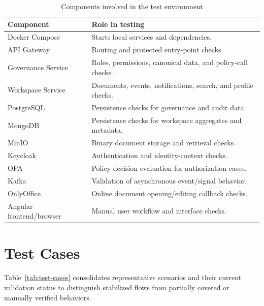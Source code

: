 \begin{table}[!htbp]
\centering
\caption{Components involved in the test environment}
\label{tab:test-environment}
{
\footnotesize
\renewcommand{\arraystretch}{1.08}
\setlength{\tabcolsep}{3.6pt}
\begin{tabularx}{\textwidth}{|L{4.0cm}|Y|}
\hline
\textbf{Component} & \textbf{Role in testing} \\
\hline
Docker Compose & Starts local services and dependencies. \\
\hline
API Gateway & Routing and protected entry-point checks. \\
\hline
Governance Service & Roles, permissions, canonical data, and policy-call checks. \\
\hline
Workspace Service & Documents, events, notifications, search, and profile checks. \\
\hline
PostgreSQL & Persistence checks for governance and audit data. \\
\hline
MongoDB & Persistence checks for workspace aggregates and metadata. \\
\hline
MinIO & Binary document storage and retrieval checks. \\
\hline
Keycloak & Authentication and identity-context checks. \\
\hline
OPA & Policy decision evaluation for authorization cases. \\
\hline
Kafka & Validation of asynchronous event/signal behavior. \\
\hline
OnlyOffice & Online document opening/editing callback checks. \\
\hline
Angular frontend/browser & Manual user workflow and interface checks. \\
\hline
\end{tabularx}
}
\end{table}

\section{Test Cases}

Table~\ref{tab:test-cases} consolidates representative scenarios and their
current validation status to distinguish stabilized flows from partially covered
or manually verified behaviors.


